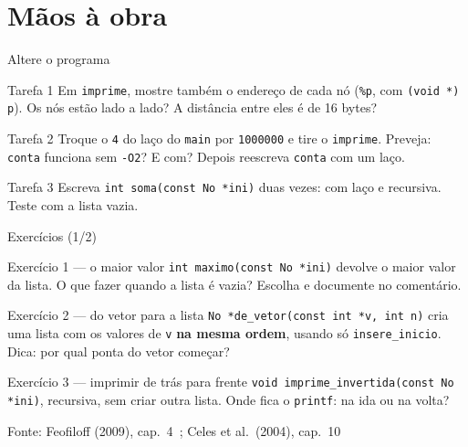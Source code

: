 \documentclass[aspectratio=169]{beamer}
\newcommand{\fonte}[1]{\vfill\hfill{\scriptsize\textcolor{UFSGray}{Fonte: #1}}}
\begin{document}
\section{Mãos à obra}

\begin{frame}{Altere o programa}
  \small
  \begin{block}{Tarefa 1}
    Em \texttt{imprime}, mostre também o endereço de cada nó
    (\texttt{\%p}, com \texttt{(void *) p}). Os nós estão lado a lado? A
    distância entre eles é de 16 bytes?
  \end{block}
  \begin{block}{Tarefa 2}
    Troque o \texttt{4} do laço do \texttt{main} por \texttt{1000000} e tire o
    \texttt{imprime}. Preveja: \texttt{conta} funciona sem \texttt{-O2}? E
    com? Depois reescreva \texttt{conta} com um laço.
  \end{block}
  \begin{block}{Tarefa 3}
    Escreva \texttt{int soma(const No *ini)} duas vezes: com laço e
    recursiva. Teste com a lista vazia.
  \end{block}
\end{frame}

\begin{frame}{Exercícios (1/2)}
  \footnotesize
  \begin{block}{Exercício 1 --- o maior valor}
    \texttt{int maximo(const No *ini)} devolve o maior valor da lista.
    O que fazer quando a lista é vazia? Escolha e documente no comentário.
  \end{block}
  \begin{block}{Exercício 2 --- do vetor para a lista}
    \texttt{No *de\_vetor(const int *v, int n)} cria uma lista com os valores
    de \texttt{v} \textbf{na mesma ordem}, usando só \texttt{insere\_inicio}.
    Dica: por qual ponta do vetor começar?
  \end{block}
  \begin{block}{Exercício 3 --- imprimir de trás para frente}
    \texttt{void imprime\_invertida(const No *ini)}, recursiva, sem criar
    outra lista. Onde fica o \texttt{printf}: na ida ou na volta?
  \end{block}
  \fonte{Feofiloff (2009), cap.~4~\cite{feofiloff2009algoritmos};
    Celes et al.\ (2004), cap.~10~\cite{celes2004introducao}}
\end{frame}
\end{document}
